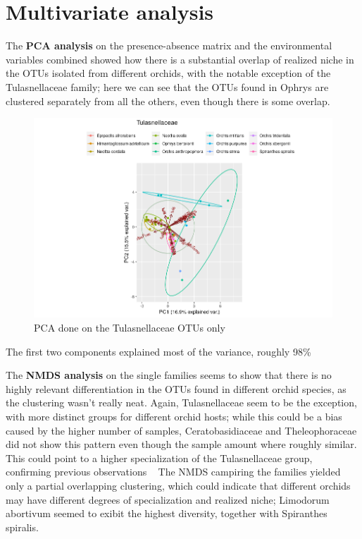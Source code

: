 \chapter{Multivariate analysis}
\label{multivariateanalysis}

The \textbf{PCA analysis} on the presence-absence matrix and the environmental variables combined showed how there is a substantial overlap of realized niche in the OTUs isolated from different orchids, with the notable exception of the Tulasnellaceae family; here we can see that the OTUs found in Ophrys are clustered separately from all the others, even though there is some overlap.

\begin{figure}[htbp]
\centering
\includegraphics[keepaspectratio,width=\textwidth,height=0.75\textheight]{images/tulPCA.png}
\caption{PCA done on the Tulasnellaceae OTUs only}
\end{figure}

The first two components explained most of the variance, roughly 98\%

The \textbf{NMDS analysis} on the single families seems to show that there is no highly relevant differentiation in the OTUs found in different orchid species, as the clustering wasn't really neat.
Again, Tulasnellaceae seem to be the exception, with more distinct groups for different orchid hosts; while this could be a bias caused by the higher number of samples, Ceratobasidiaceae and Theleophoraceae did not show this pattern even though the sample amount where roughly similar. This could point to a higher specialization of the Tulasnellaceae group, confirming previous observations ~\citep{dearnaley2007}
The NMDS campiring the families yielded only a partial overlapping clustering, which could indicate that different orchids may have different degrees of specialization and realized niche; Limodorum abortivum seemed to exibit the highest diversity, together with Spiranthes spiralis.

